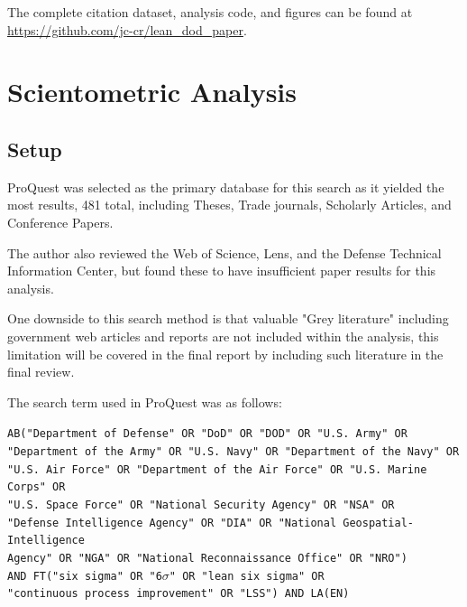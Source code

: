 \documentclass{article}
\begin{document}
		The complete citation dataset, analysis code, and figures can be found at \url{https://github.com/jc-cr/lean_dod_paper}.

	\section{Scientometric Analysis}

	\subsection{Setup}

		ProQuest was selected as the primary database for this search as it yielded the most results, 481 total, including Theses, Trade journals, Scholarly Articles, and Conference Papers.

		The author also reviewed the Web of Science, Lens, and the Defense Technical Information Center, but found these to have insufficient paper results for this analysis.

		One downside to this search method is that valuable "Grey literature" including government web articles and reports are not included within the analysis, this limitation will be covered in the final report by including such literature in the final review.

		The search term used in ProQuest was as follows:

		\begin{minipage}{\linewidth}
		\begin{spacing}{0.8}
		\noindent\texttt{AB("Department of Defense" OR "DoD" OR "DOD" OR "U.S. Army" OR} \\
		\texttt{"Department of the Army" OR "U.S. Navy" OR "Department of the Navy" OR} \\
		\texttt{"U.S. Air Force" OR "Department of the Air Force" OR "U.S. Marine Corps" OR} \\
		\texttt{"U.S. Space Force" OR "National Security Agency" OR "NSA" OR} \\
		\texttt{"Defense Intelligence Agency" OR "DIA" OR "National Geospatial-Intelligence} \\
		\texttt{Agency" OR "NGA" OR "National Reconnaissance Office" OR "NRO")} \\
		\texttt{AND FT("six sigma" OR "6$\sigma$" OR "lean six sigma" OR} \\
		\texttt{"continuous process improvement" OR "LSS") AND LA(EN)}
		\end{spacing}
		\end{minipage}
\end{document}
